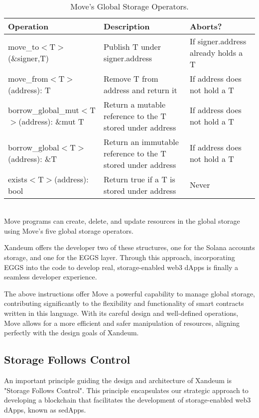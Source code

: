 \documentclass[11 pt]{article}   	%
\begin{document}
\ \\
\phantom{~}
\begin{table}[!h]
\begin{center}
\begin{tabular}{p{}p{}p{}}
\hline
\textbf{Operation} & \textbf{Description} & \textbf{Aborts?} \\ \hline
move\_to$<$T$>$(\&signer,T) & Publish T under signer.address & If signer.address already holds a T \\ \hline
move\_from$<$T$>$(address): T & Remove T from address and return it & If address does not hold a T \\ \hline
borrow\_global\_mut$<$T$>$(address): \&mut T & Return a mutable reference to the T stored under address & If address does not hold a T \\ \hline
borrow\_global$<$T$>$(address): \&T & Return an immutable reference to the T stored under address & If address does not hold a T \\ \hline
exists$<$T$>$(address): bool & Return true if a T is stored under address & Never \\ \hline
\end{tabular}
\caption{\label{movesto}Move's Global Storage Operators.}
\end{center}
\end{table}
\ \\
Move programs can create, delete, and update resources in the global storage using Move's five global storage operators.

Xandeum offers the developer two of these structures, one for the Solana accounts storage, and one for the EGGS layer. Through this approach, incorporating EGGS into the code to develop real, storage-enabled web3 dApps is finally a seamless developer experience.

The above instructions offer Move a powerful capability to manage global storage, contributing significantly to the flexibility and functionality of smart contracts written in this language. With its careful design and well-defined operations, Move allows for a more efficient and safer manipulation of resources, aligning perfectly with the design goals of Xandeum.

\subsection{Storage Follows Control}
An important principle guiding the design and architecture of Xandeum is "Storage Follows Control". This principle encapsulates our strategic approach to developing a blockchain that facilitates the development of storage-enabled web3 dApps, known as sedApps.
\end{document}
